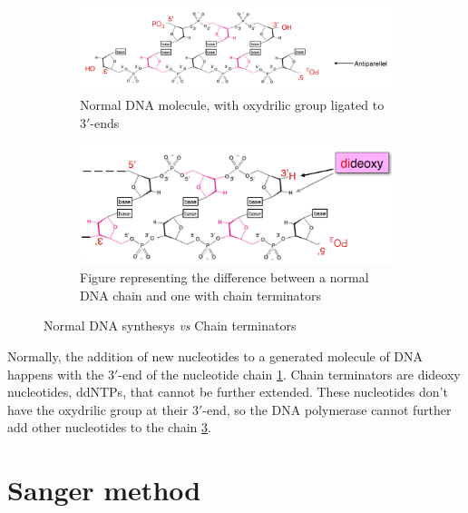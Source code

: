    \begin{figure}[H]
        \centering
        \begin{subfigure}[b]{0.49\textwidth}
            \centering
            \includegraphics[width=\textwidth]{DNA-molecule}
            \caption{Normal DNA molecule, with oxydrilic group ligated to $3'$-ends}
            \label{normalDNAaddition}
        \end{subfigure}
        \hfill
        \begin{subfigure}[b]{0.49\textwidth}
            \centering
            \includegraphics[width=\textwidth]{chain-term}
            \caption{Figure representing the difference between a normal DNA chain and one with chain terminators}
            \label{ChainTerm}
        \end{subfigure}
        \caption{Normal DNA synthesys \textit{vs} Chain terminators}
    \end{figure}

    Normally, the addition of new nucleotides to a generated molecule of DNA happens with the $3'$-end of the nucleotide chain \ref{normalDNAaddition}.
    Chain terminators are dideoxy nucleotides, ddNTPs, that cannot be further extended.
    These nucleotides don't have the oxydrilic group at their $3'$-end, so the DNA polymerase cannot further add other nucleotides to the chain \ref{ChainTerm}.

\section{Sanger method}

